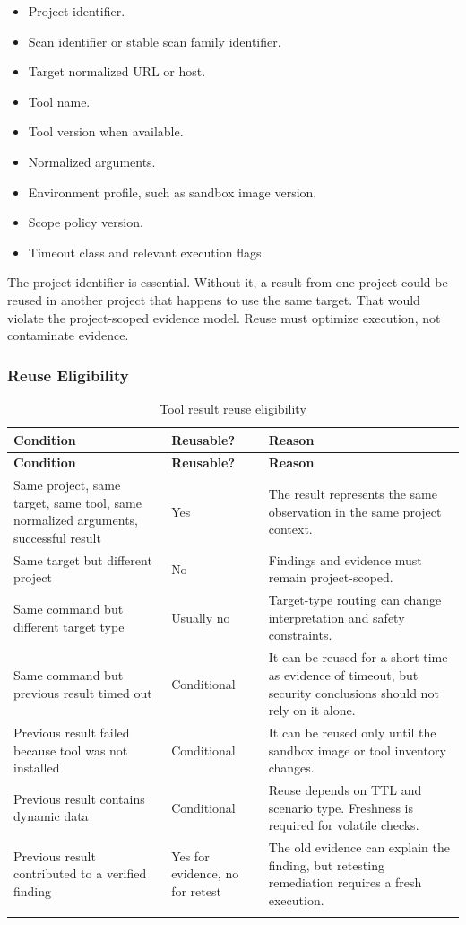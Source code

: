 \documentclass[12pt,a4paper]{report}
\begin{document}
\begin{itemize}
    \item Project identifier.
    \item Scan identifier or stable scan family identifier.
    \item Target normalized URL or host.
    \item Tool name.
    \item Tool version when available.
    \item Normalized arguments.
    \item Environment profile, such as sandbox image version.
    \item Scope policy version.
    \item Timeout class and relevant execution flags.
\end{itemize}

The project identifier is essential. Without it, a result from one project could be
reused in another project that happens to use the same target. That would violate the
project-scoped evidence model. Reuse must optimize execution, not contaminate evidence.

\subsubsection{Reuse Eligibility}

\begin{longtable}{|p{}|p{}|p{}|}
\hline
\textbf{Condition} & \textbf{Reusable?} & \textbf{Reason} \\
\hline
\endfirsthead
\hline
\textbf{Condition} & \textbf{Reusable?} & \textbf{Reason} \\
\hline
\endhead
Same project, same target, same tool, same normalized arguments, successful result &
Yes & The result represents the same observation in the same project context. \\
\hline
Same target but different project & No & Findings and evidence must remain
project-scoped. \\
\hline
Same command but different target type & Usually no & Target-type routing can change
interpretation and safety constraints. \\
\hline
Same command but previous result timed out & Conditional & It can be reused for a short
time as evidence of timeout, but security conclusions should not rely on it alone. \\
\hline
Previous result failed because tool was not installed & Conditional & It can be reused
only until the sandbox image or tool inventory changes. \\
\hline
Previous result contains dynamic data & Conditional & Reuse depends on TTL and
scenario type. Freshness is required for volatile checks. \\
\hline
Previous result contributed to a verified finding & Yes for evidence, no for retest &
The old evidence can explain the finding, but retesting remediation requires a fresh
execution. \\
\hline
\caption{Tool result reuse eligibility}
\label{tab:reuse_eligibility}
\end{longtable}
\end{document}
